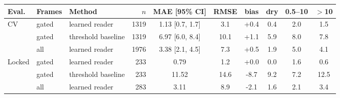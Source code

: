 \begin{tabular}{@{}lllrcccccc@{}}
\toprule
Eval. & Frames & Method & $n$ & MAE [95\% CI] & RMSE & bias & dry & 0.5--10 & $>$10 \\
\midrule
CV & gated & learned reader & 1319 & 1.13 [0.7, 1.7] & 3.1 & +0.4 & 0.4 & 2.0 & 1.5 \\
 & gated & threshold baseline & 1319 & 6.97 [6.0, 8.4] & 10.1 & +1.1 & 5.9 & 8.0 & 7.8 \\
 & all & learned reader & 1976 & 3.38 [2.1, 4.5] & 7.3 & +0.5 & 1.9 & 5.0 & 4.1 \\
\midrule
Locked & gated & learned reader & 233 & 0.79 & 1.2 & +0.0 & 0.0 & 1.6 & 0.6 \\
 & gated & threshold baseline & 233 & 11.52 & 14.6 & -8.7 & 9.2 & 7.2 & 12.5 \\
 & all & learned reader & 283 & 3.11 & 8.9 & -2.1 & 1.6 & 2.1 & 3.4 \\
\bottomrule
\end{tabular}
